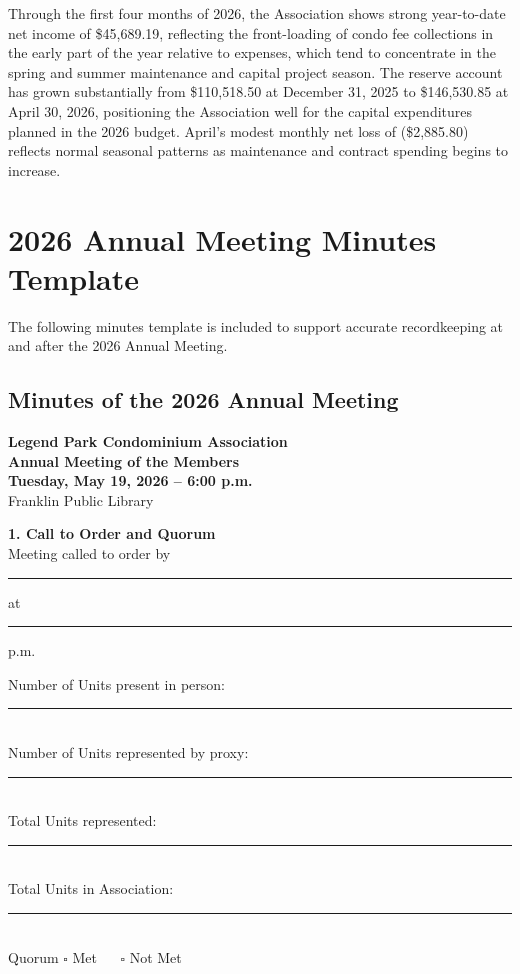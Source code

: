 \documentclass[11pt]{article}
\newcommand{\strong}[1]{\textbf{#1}}
\newcommand{\money}[1]{\$#1}
\begin{document}
\noindent
Through the first four months of 2026, the Association shows strong year-to-date net income
of \money{45{,}689.19}, reflecting the front-loading of condo fee collections in the early
part of the year relative to expenses, which tend to concentrate in the spring and summer
maintenance and capital project season. The reserve account has grown substantially from
\money{110{,}518.50} at December 31, 2025 to \money{146{,}530.85} at April 30, 2026,
positioning the Association well for the capital expenditures planned in the 2026 budget.
April's modest monthly net loss of (\money{2{,}885.80}) reflects normal seasonal patterns
as maintenance and contract spending begins to increase.

\newpage

\section{2026 Annual Meeting Minutes Template}

The following minutes template is included to support accurate recordkeeping at and
after the 2026 Annual Meeting.

\subsection*{Minutes of the 2026 Annual Meeting}
\vspace{-0.6em}

\noindent
\textbf{Legend Park Condominium Association}\\
\textbf{Annual Meeting of the Members}\\
\textbf{Tuesday, May 19, 2026 -- 6{:}00 p.m.}\\
Franklin Public Library

\vspace{1em}

\noindent
\strong{1. Call to Order and Quorum}\\[0.5em]
Meeting called to order by \rule{2.5in}{0.4pt} at \rule{1in}{0.4pt} p.m.

\medskip

\noindent
Number of Units present in person: \rule{1in}{0.4pt}\\
Number of Units represented by proxy: \rule{1in}{0.4pt}\\
Total Units represented: \rule{1in}{0.4pt}\\
Total Units in Association: \rule{1in}{0.4pt}\\[0.25em]
Quorum \(\square\) Met \(\quad\) \(\square\) Not Met
\end{document}
